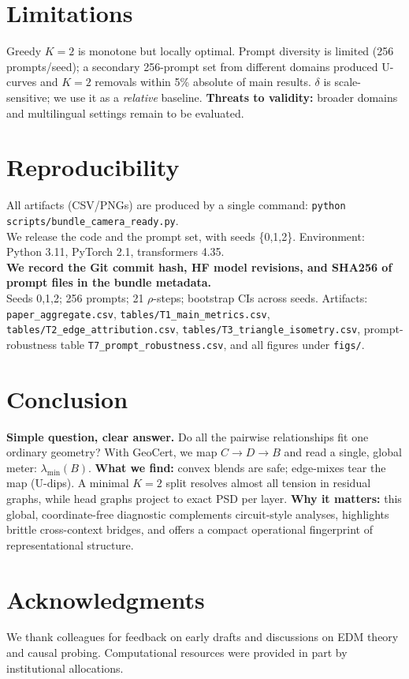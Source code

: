 \documentclass[11pt]{article}
\newcommand{\1}{\mathbf{1}}
\begin{document}
\section{Limitations}
\FloatBarrier
Greedy $K{=}2$ is monotone but locally optimal. Prompt diversity is limited (256 prompts/seed); a secondary 256-prompt set from different domains produced U-curves and $K{=}2$ removals within 5\% absolute of main results. $\delta$ is scale-sensitive; we use it as a \emph{relative} baseline. \textbf{Threats to validity:} broader domains and multilingual settings remain to be evaluated.

\section{Reproducibility}
\FloatBarrier
All artifacts (CSV/PNGs) are produced by a single command:
\texttt{python scripts/bundle\_camera\_ready.py}.\\
We release the code and the prompt set, with seeds \{0,1,2\}. Environment: Python 3.11, PyTorch 2.1, transformers 4.35.\\
\textbf{We record the Git commit hash, HF model revisions, and SHA256 of prompt files in the bundle metadata.}\\
Seeds 0,1,2; 256 prompts; 21 $\rho$-steps; bootstrap CIs across seeds. Artifacts: \texttt{paper\_aggregate.csv}, \texttt{tables/T1\_main\_metrics.csv}, \texttt{tables/T2\_edge\_attribution.csv}, \texttt{tables/T3\_triangle\_isometry.csv}, prompt-robustness table \texttt{T7\_prompt\_robustness.csv}, and all figures under \texttt{figs/}.

\section{Conclusion}
\FloatBarrier
\textbf{Simple question, clear answer.} Do all the pairwise relationships fit one ordinary geometry? With GeoCert, we map $C\!\to\!D\!\to\!B$ and read a single, global meter: $\lambda_{\min}(B)$. \textbf{What we find:} convex blends are safe; edge-mixes tear the map (U-dips). A minimal $K{=}2$ split resolves almost all tension in residual graphs, while head graphs project to exact PSD per layer. \textbf{Why it matters:} this global, coordinate-free diagnostic complements circuit-style analyses, highlights brittle cross-context bridges, and offers a compact operational fingerprint of representational structure.

\section*{Acknowledgments}
We thank colleagues for feedback on early drafts and discussions on EDM theory and causal probing. Computational resources were provided in part by institutional allocations.
\end{document}
